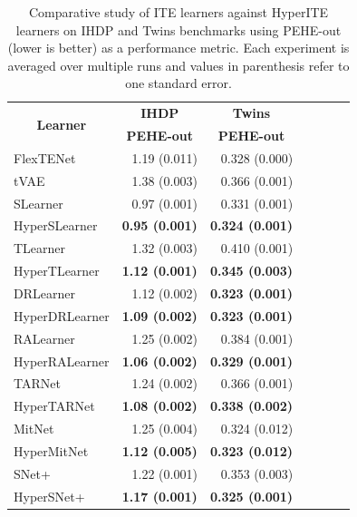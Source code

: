 \documentclass{article}
\begin{document}
\begin{table}[htb!]
	\centering
	\caption{Comparative study of ITE learners against HyperITE learners on IHDP and Twins benchmarks using PEHE-out (lower is better) as a performance metric. Each experiment is averaged over multiple runs and values in parenthesis refer to one standard error.}
	\label{tab_tvae}
	\begin{tabular}{lrrrrrr}\\ \hline
		\multicolumn{1}{c}{\multirow{2}{*}{\textbf{Learner}}} &
		\multicolumn{1}{c}{\textbf{IHDP}} &
		\multicolumn{1}{c}{\textbf{Twins}} \\
		\multicolumn{1}{c}{} &
		\multicolumn{1}{c}{\textbf{PEHE-out}} &
		\multicolumn{1}{c}{\textbf{PEHE-out}} \\ \hline
		FlexTENet      & 1.19 (0.011) & 0.328	(0.000)  \\
		tVAE           & 1.38 (0.003) & 0.366	(0.001)  \\ \hline
		SLearner       & 0.97 (0.001) & 0.331	(0.001)\\
		HyperSLearner  & \textbf{0.95 (0.001)} &  \textbf{0.324	(0.001)}\\ \hline
		TLearner       & 1.32 (0.003) &  0.410	(0.001) \\
		HyperTLearner  & \textbf{1.12 (0.001)} &  \textbf{0.345	(0.003)} \\ \hline
		DRLearner      & 1.12 (0.002) & \textbf{0.323 (0.001)}\\
		HyperDRLearner & \textbf{1.09 (0.002)} & \textbf{0.323	(0.001)}\\ \hline
		RALearner      & 1.25 (0.002) & 0.384	(0.001) \\
		HyperRALearner & \textbf{1.06 (0.002)} & \textbf{0.329	(0.001)} \\ \hline
		TARNet         & 1.24 (0.002) &	0.366	(0.001) \\
		HyperTARNet    & \textbf{1.08 (0.002)}  &	\textbf{0.338	(0.002)} \\ \hline
		MitNet         & 1.25 (0.004) &	0.324	(0.012) \\
		HyperMitNet  & \textbf{1.12	(0.005)} & \textbf{0.323	(0.012)} \\ \hline
		SNet+          & 1.22 (0.001) &  0.353	(0.003)\\
		HyperSNet+     & \textbf{1.17 (0.001)} &  \textbf{0.325	(0.001)}\\ \hline
	\end{tabular}
\end{table}
\end{document}

